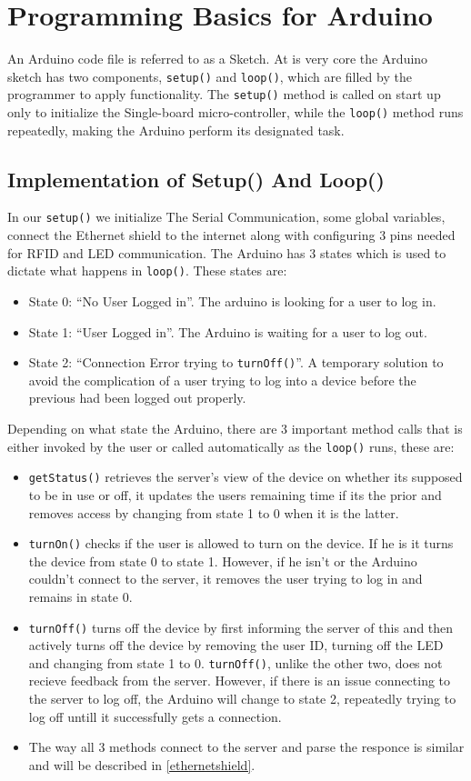\section{Programming Basics for Arduino}

An Arduino code file is referred to as a Sketch. At is very core the Arduino sketch has two components, \verb|setup()| and \verb|loop()|, which are filled by the programmer to apply functionality.
The \verb|setup()| method is called on start up only to initialize the Single-board micro-controller, while the \verb|loop()| method runs repeatedly, making the Arduino perform its designated task.
\subsection*{Implementation of Setup() And Loop()}
In our \verb|setup()| we initialize The Serial Communication, some global variables, connect the Ethernet shield to the internet along with configuring 3 pins needed for RFID and LED communication.\newline
The Arduino has 3 states which is used to dictate what happens in \verb|loop()|. These states are:
\begin{itemize}
	\item State 0: ``No User Logged in''. The arduino is looking for a user to log in.
	\item State 1: ``User Logged in''. The Arduino is waiting for a user to log out.
	\item State 2: ``Connection Error trying to \verb|turnOff()|''. A temporary solution to avoid the complication of a user trying to log into a device before the previous had been logged out properly.
\end{itemize}
Depending on what state the Arduino, there are 3 important method calls that is either invoked by the user or called automatically as the \verb|loop()| runs, these are:
\begin{itemize}
	\item \verb|getStatus()| retrieves the server's view of the device on whether its supposed to be in use or off, it updates the users remaining time if its the prior and removes access by changing from state 1 to 0 when it is the latter.
	\item \verb|turnOn()| checks if the user is allowed to turn on the device. If he is it turns the device from state 0 to state 1. However, if he isn't or the Arduino couldn't connect to the server, it removes the user trying to log in and remains in state 0.
	\item \verb|turnOff()| turns off the device by first informing the server of this and then actively turns off the device by removing the user ID, turning off the LED and changing from state 1 to 0. \verb|turnOff()|, unlike the other two, does not recieve feedback from the server. However, if there is an issue connecting to the server to log off, the Arduino will change to state 2, repeatedly trying to log off untill it successfully gets a connection.
	\item The way all 3 methods connect to the server and parse the responce is similar and will be described in \autoref{ethernetshield}.
\end{itemize}
